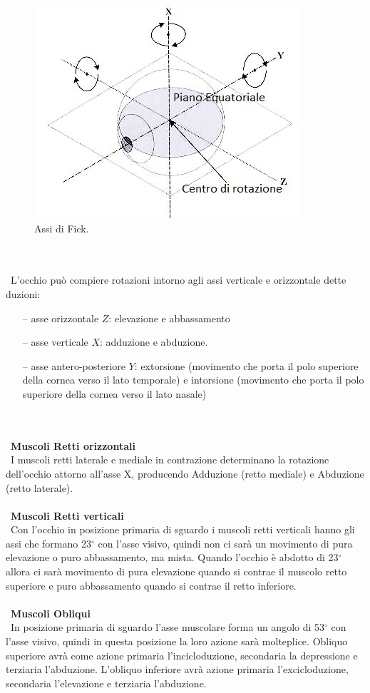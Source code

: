 \begin{figure}[h!]
	\centering
	\includegraphics[scale=0.49]{source/immagini/Assi.jpg}
	\caption[Assi di Fick]{Assi di Fick.}
	\label{fig:test7}
\end{figure}
\\\  \\\
L’occhio può compiere rotazioni intorno agli assi verticale e orizzontale dette duzioni:
 \begin{itemize}
 \itemsep-0.7em 
 \item[--]asse orizzontale $Z$: elevazione e abbassamento
 \item[--]asse verticale $X$: adduzione e abduzione.
 \item[--]asse antero-posteriore $Y$: extorsione (movimento che porta il polo superiore della cornea verso il lato temporale) e intorsione (movimento che porta il polo superiore della cornea verso il lato nasale)
 \end{itemize}
\\\ \\\
\textbf{Muscoli Retti orizzontali}
\\\
I muscoli retti laterale e mediale in contrazione determinano la rotazione dell’occhio attorno all’asse X, producendo Adduzione (retto mediale) e Abduzione (retto laterale).
\\\ \\\	
\textbf{Muscoli Retti verticali}
\\\
Con l’occhio in posizione primaria di sguardo i muscoli retti verticali hanno gli assi che formano 23$^{\circ}$ con l’asse visivo, quindi non ci sarà un movimento di pura elevazione o puro abbassamento, ma mista. Quando l’occhio è abdotto di 23$^{\circ}$ allora ci sarà movimento di pura elevazione quando si contrae il muscolo retto superiore e puro abbassamento quando si contrae il retto inferiore.
\\\ \\\
\textbf{Muscoli Obliqui}
\\\ 
In posizione primaria di sguardo l’asse muscolare forma un angolo di 53$^{\circ}$ con l’asse visivo, quindi in questa posizione la loro azione sarà molteplice. Obliquo superiore avrà come azione primaria l’incicloduzione, secondaria la depressione e terziaria l’abduzione. L’obliquo inferiore avrà azione primaria l’excicloduzione, secondaria l’elevazione e terziaria l’abduzione. 

